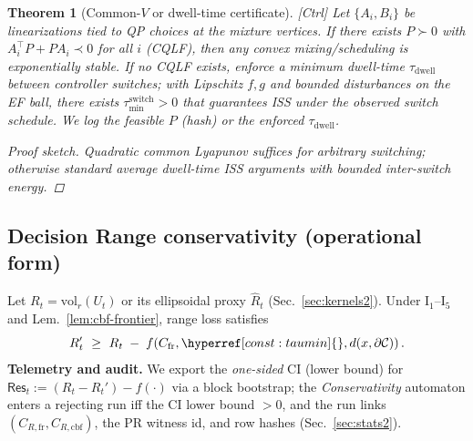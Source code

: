\documentclass[10pt]{article}
\newenvironment{proofsketch}{\begin{proof}[Proof sketch]}{\end{proof}}
\newcommand{\layertag}[1]{\textup{[#1]}}
\newcommand{\constref}[1]{\hyperref[const:#1]{\ensuremath{\csname constsym#1\endcsname}}}
\newtheorem{theorem}{Theorem}
\begin{document}
\begin{theorem}[Common-$V$ or dwell-time certificate]\label{thm:switch-stab}
\emph{\layertag{Ctrl}}
Let $\{A_i,B_i\}$ be linearizations tied to QP choices at the mixture vertices. If there exists $P\succ 0$ with $A_i^\top P+P A_i \prec 0$ for all $i$ (CQLF), then any convex mixing/scheduling is exponentially stable. If no CQLF exists, enforce a minimum dwell-time $\tau_{\mathrm{dwell}}$ between controller switches; with Lipschitz $f,g$ and bounded disturbances on the EF ball, there exists $\tau_{\min}^{\mathrm{switch}}>0$ that guarantees ISS under the observed switch schedule. We log the feasible $P$ (hash) or the enforced $\tau_{\mathrm{dwell}}$.
\begin{proofsketch}
Quadratic common Lyapunov suffices for arbitrary switching; otherwise standard average dwell-time ISS arguments with bounded inter-switch energy.
\end{proofsketch}
\end{theorem}

\subsection*{Decision Range conservativity (operational form)}
Let $R_t=\mathrm{vol}_r(U_t)$ or its ellipsoidal proxy $\widehat R_t$ (Sec.~\ref{sec:kernels2}). Under I$_1$–I$_5$ and Lem.~\ref{lem:cbf-frontier}, range loss satisfies
\[
R_t' \ \ge\ R_t\;-\;f\!\left(C_{\mathrm{fr}},\constref{taumin},d(x,\partial\mathcal C)\right).
\]
\textbf{Telemetry and audit.} We export the \emph{one-sided} CI (lower bound) for
\(
\mathsf{Res}_t:=(R_t-R_t')-f(\cdot)
\)
via a block bootstrap; the \emph{Conservativity} automaton enters a rejecting run iff the CI lower bound $>0$, and the run links $(C_{R,\mathrm{fr}},C_{R,\mathrm{cbf}})$, the PR witness id, and row hashes (Sec.~\ref{sec:stats2}).

\end{document}
